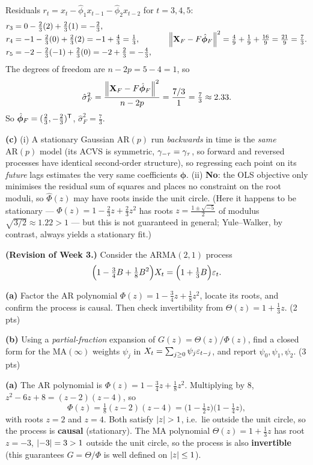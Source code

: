 \documentclass[11pt]{article}
\begin{document}
Residuals $r_t=x_t-\hat\phi_1x_{t-1}-\hat\phi_2x_{t-2}$ for $t=3,4,5$:
\[
\begin{aligned}
r_3&=0-\tfrac23(2)+\tfrac23(1)=-\tfrac23,\\
r_4&=-1-\tfrac23(0)+\tfrac23(2)=-1+\tfrac43=\tfrac13,\\
r_5&=-2-\tfrac23(-1)+\tfrac23(0)=-2+\tfrac23=-\tfrac43,
\end{aligned}
\qquad
\left\lVert \mathbf X_F-F\hat{\boldsymbol\phi}_F \right\rVert^2=\tfrac49+\tfrac19+\tfrac{16}{9}=\tfrac{21}{9}=\tfrac73 .
\]
The degrees of freedom are $n-2p=5-4=1$, so
\[
\hat\sigma_F^2=\frac{\left\lVert \mathbf X_F-F\hat{\boldsymbol\phi}_F \right\rVert^2}{n-2p}
=\frac{7/3}{1}=\tfrac73\approx2.33 .
\]
So $\hat{\boldsymbol\phi}_F=(\tfrac23,-\tfrac23)^{\mathsf{T}}$, $\hat\sigma_F^2=\tfrac73$.

\textbf{(c)} (i) A stationary Gaussian $\mathrm{AR}(p)$ run \emph{backwards} in
time is the \emph{same} $\mathrm{AR}(p)$ model (its ACVS is symmetric,
$\gamma_{-\tau}=\gamma_\tau$, so forward and reversed processes have identical
second-order structure), so regressing each point on its \emph{future} lags
estimates the very same coefficients $\boldsymbol\phi$. (ii) \textbf{No}: the
OLS objective only minimises the residual sum of squares and places no
constraint on the root moduli, so $\hat\Phi(z)$ may have roots inside the unit
circle. (Here it happens to be stationary --- $\Phi(z)=1-\tfrac23z+\tfrac23z^2$
has roots $z=\tfrac{1\pm\sqrt{-5}}{2}$ of modulus $\sqrt{3/2}\approx1.22>1$ ---
but this is not guaranteed in general; Yule--Walker, by contrast, always yields a
stationary fit.)

\statementstart
\textbf{(Revision of Week 3.)} Consider the $\mathrm{ARMA}(2,1)$ process
\[
\Big(1-\tfrac34B+\tfrac18B^2\Big)X_t=\Big(1+\tfrac13B\Big)\varepsilon_t .
\]

\textbf{(a)} Factor the AR polynomial $\Phi(z)=1-\tfrac34 z+\tfrac18 z^2$, locate its roots, and confirm the process is causal. Then check invertibility from $\Theta(z)=1+\tfrac13 z$. \hfill(2 pts)

\textbf{(b)} Using a \emph{partial-fraction} expansion of $G(z)=\Theta(z)/\Phi(z)$, find a closed form for the $\mathrm{MA}(\infty)$ weights $\psi_j$ in $X_t=\sum_{j\ge0}\psi_j\varepsilon_{t-j}$, and report $\psi_0,\psi_1,\psi_2$. \hfill(3 pts)
\statementend

\textbf{(a)} The AR polynomial is
$\Phi(z)=1-\tfrac34 z+\tfrac18 z^2$. Multiplying by $8$, $z^2-6z+8=(z-2)(z-4)$,
so
\[
\Phi(z)=\tfrac18(z-2)(z-4)=\Big(1-\tfrac12 z\Big)\Big(1-\tfrac14 z\Big),
\]
with roots $z=2$ and $z=4$. Both satisfy $\left\lvert z \right\rvert>1$, i.e.\ lie outside the unit
circle, so the process is \textbf{causal} (stationary). The MA polynomial
$\Theta(z)=1+\tfrac13 z$ has root $z=-3$, $\left\lvert -3 \right\rvert=3>1$ outside the unit circle,
so the process is also \textbf{invertible} (this guarantees $G=\Theta/\Phi$ is
well defined on $\left\lvert z \right\rvert\le1$).
\end{document}

